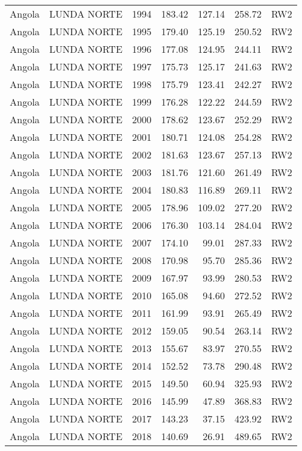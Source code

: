 \begin{longtable}{lllrrrl}
  Angola & LUNDA NORTE & 1994 & 183.42 & 127.14 & 258.72 & RW2 \\ 
  Angola & LUNDA NORTE & 1995 & 179.40 & 125.19 & 250.52 & RW2 \\ 
  Angola & LUNDA NORTE & 1996 & 177.08 & 124.95 & 244.11 & RW2 \\ 
  Angola & LUNDA NORTE & 1997 & 175.73 & 125.17 & 241.63 & RW2 \\ 
  Angola & LUNDA NORTE & 1998 & 175.79 & 123.41 & 242.27 & RW2 \\ 
  Angola & LUNDA NORTE & 1999 & 176.28 & 122.22 & 244.59 & RW2 \\ 
  Angola & LUNDA NORTE & 2000 & 178.62 & 123.67 & 252.29 & RW2 \\ 
  Angola & LUNDA NORTE & 2001 & 180.71 & 124.08 & 254.28 & RW2 \\ 
  Angola & LUNDA NORTE & 2002 & 181.63 & 123.67 & 257.13 & RW2 \\ 
  Angola & LUNDA NORTE & 2003 & 181.76 & 121.60 & 261.49 & RW2 \\ 
  Angola & LUNDA NORTE & 2004 & 180.83 & 116.89 & 269.11 & RW2 \\ 
  Angola & LUNDA NORTE & 2005 & 178.96 & 109.02 & 277.20 & RW2 \\ 
  Angola & LUNDA NORTE & 2006 & 176.30 & 103.14 & 284.04 & RW2 \\ 
  Angola & LUNDA NORTE & 2007 & 174.10 & 99.01 & 287.33 & RW2 \\ 
  Angola & LUNDA NORTE & 2008 & 170.98 & 95.70 & 285.36 & RW2 \\ 
  Angola & LUNDA NORTE & 2009 & 167.97 & 93.99 & 280.53 & RW2 \\ 
  Angola & LUNDA NORTE & 2010 & 165.08 & 94.60 & 272.52 & RW2 \\ 
  Angola & LUNDA NORTE & 2011 & 161.99 & 93.91 & 265.49 & RW2 \\ 
  Angola & LUNDA NORTE & 2012 & 159.05 & 90.54 & 263.14 & RW2 \\ 
  Angola & LUNDA NORTE & 2013 & 155.67 & 83.97 & 270.55 & RW2 \\ 
  Angola & LUNDA NORTE & 2014 & 152.52 & 73.78 & 290.48 & RW2 \\ 
  Angola & LUNDA NORTE & 2015 & 149.50 & 60.94 & 325.93 & RW2 \\ 
  Angola & LUNDA NORTE & 2016 & 145.99 & 47.89 & 368.83 & RW2 \\ 
  Angola & LUNDA NORTE & 2017 & 143.23 & 37.15 & 423.92 & RW2 \\ 
  Angola & LUNDA NORTE & 2018 & 140.69 & 26.91 & 489.65 & RW2 \\ 

\end{longtable}
